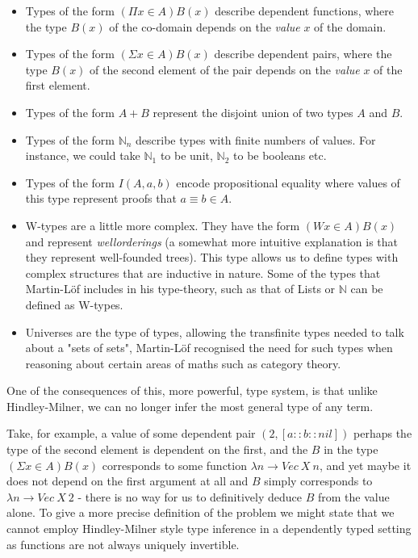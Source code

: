           \begin{itemize}
          \item Types of the form $( \Pi x \in A ) B(x)$ describe
            dependent functions, where the type $B(x)$ of the co-domain
            depends on the \emph{value} $x$ of the domain.
          \item Types of the form $( \Sigma x \in A ) B(x)$ describe
            dependent pairs, where the type $B(x)$ of the second
            element of the pair depends on the \emph{value} $x$ of the
            first element.
          \item Types of the form $A + B$ represent the disjoint union
            of two types $A$ and $B$.
          \item Types of the form $\mathbb{N}_n$ describe types
            with finite numbers of values. For instance, we could take
            $\mathbb{N}_1$ to be unit, $\mathbb{N}_2$ to be booleans
            etc.
          \item Types of the form $I (A , a , b)$ encode propositional
            equality where values of this type represent proofs
            that $a \equiv b \in A$.
          \item W-types are a little more complex. They have the form
            $( W x \in A ) B(x)$ and represent \emph{wellorderings} (a
            somewhat more intuitive explanation is that they represent
            well-founded trees). This type allows us to define types
            with complex structures that are inductive in nature.
            Some of the types that Martin-Löf includes in his
            type-theory, such as that of Lists or $\mathbb{N}$ can be
            defined as W-types.
          \item Universes are the type of types, allowing
            the transfinite types needed to talk about a "sets of
            sets", Martin-Löf recognised the need for such types when
            reasoning about certain areas of maths such as category
            theory.
          \end{itemize}

          One of the consequences of this, more powerful, type system,
          is that unlike Hindley-Milner, we can no longer infer the
          most general type of any term.

          Take, for example, a value of some dependent pair $(2 , [a :: b
            :: nil])$ perhaps the type of the second element is
          dependent on the first, and the $B$ in the type $(
          \Sigma x \in A ) B(x)$ corresponds to some function $\lambda
          n \to Vec \: X \: n$, and yet maybe it does not depend on the first
          argument at all and $B$ simply corresponds to $\lambda n \to
          Vec \: X \: 2$ - there is no way for us to definitively
          deduce $B$ from the value alone. To give a more precise
          definition of the problem we might state that we cannot
          employ Hindley-Milner style type inference in a dependently
          typed setting as functions are not always uniquely invertible.

